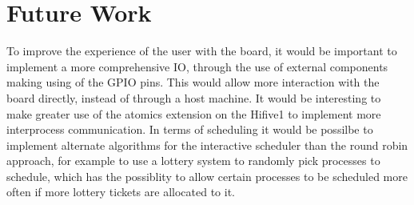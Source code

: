 \section{Future Work}
To improve the experience of the user with the board, it would be important to implement a more comprehensive IO, through the use of external components making using of the GPIO pins. This would allow more interaction with the board directly, instead of through a host machine. It would be interesting to make greater use of the atomics extension on the Hifive1 to implement more interprocess communication. In terms of scheduling it would be possilbe to implement alternate algorithms for the interactive scheduler than the round robin approach, for example to use a lottery system to randomly pick processes to schedule, which has the possiblity to allow certain processes to be scheduled more often if more lottery tickets are allocated to it.
